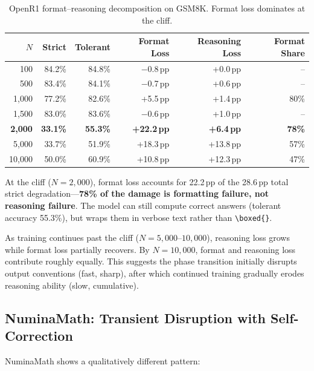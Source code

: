 \documentclass{article}
\begin{document}
\begin{table}[h]
\centering
\caption{OpenR1 format--reasoning decomposition on GSM8K. Format loss dominates at the cliff.}
\label{tab:decomp-openr1}
\small
\begin{tabular}{@{}rrrrrr@{}}
\toprule
$N$ & Strict & Tolerant & Format Loss & Reasoning Loss & Format Share \\
\midrule
100 & 84.2\% & 84.8\% & $-$0.8\,pp & +0.0\,pp & -- \\
500 & 83.4\% & 84.1\% & $-$0.7\,pp & +0.6\,pp & -- \\
1,000 & 77.2\% & 82.6\% & +5.5\,pp & +1.4\,pp & 80\% \\
1,500 & 83.0\% & 83.6\% & $-$0.6\,pp & +1.0\,pp & -- \\
\textbf{2,000} & \textbf{33.1\%} & \textbf{55.3\%} & \textbf{+22.2\,pp} & \textbf{+6.4\,pp} & \textbf{78\%} \\
5,000 & 33.7\% & 51.9\% & +18.3\,pp & +13.8\,pp & 57\% \\
10,000 & 50.0\% & 60.9\% & +10.8\,pp & +12.3\,pp & 47\% \\
\bottomrule
\end{tabular}
\end{table}

At the cliff ($N{=}2{,}000$), format loss accounts for 22.2\,pp of the 28.6\,pp total strict degradation---\textbf{78\% of the damage is formatting failure, not reasoning failure}. The model can still compute correct answers (tolerant accuracy 55.3\%), but wraps them in verbose text rather than \texttt{\textbackslash boxed\{\}}.

As training continues past the cliff ($N{=}5{,}000$--$10{,}000$), reasoning loss grows while format loss partially recovers. By $N{=}10{,}000$, format and reasoning loss contribute roughly equally. This suggests the phase transition initially disrupts output conventions (fast, sharp), after which continued training gradually erodes reasoning ability (slow, cumulative).

\subsection{NuminaMath: Transient Disruption with Self-Correction}
\label{sec:asymmetry}

NuminaMath shows a qualitatively different pattern:
\end{document}
